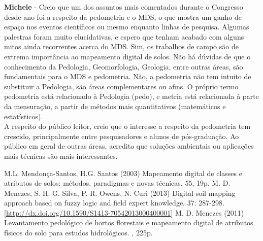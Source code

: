 \noindent \textbf{Michele} - Creio que um dos assuntos mais comentados durante o Congresso desde ano foi a respeito da pedometria e o MDS, o que mostra um ganho de espaço nos eventos científicos ou mesmo enquanto linhas de pesquisa. Algumas palestras foram muito elucidativas, e espero que tenham acabado com alguns mitos ainda recorrentes acerca do MDS. Sim, os trabalhos de campo são de extrema importância ao mapeamento digital de solos. Não há dúvidas de que o conhecimento da Pedologia, Geomorfologia, Geologia, entre outras áreas, são fundamentais para o MDS e pedometria. Não, a pedometria não tem intuito de substituir a Pedologia, são áreas complementares ou afins. O próprio termo pedometria está relacionado à Pedologia (pedo), e metria está relacionada à parte da mensuração, a partir de métodos mais quantitativos (matemáticos e estatísticos).\\
A respeito do público leitor, creio que o interesse a respeito da pedometria tem crescido, principalmente entre pesquisadores e alunos de pós-graduação. Ao público em geral de outras áreas, acredito que soluções ambientais ou aplicações mais técnicas são mais interessantes.
\begin{footnotesize}
\begin{thebibliography}{99}
M.L. Mendonça-Santos, H.G. Santos (2003)
\newblock Mapeamento digital de classes e atributos de solos: métodos, paradigmas e novas técnicas.
 55, 19p.
M. D. Menezes, S. H. G. Silva, P. R. Owens, N. Curi (2013)
\newblock Digital soil mapping approach based on fuzzy logic and field expert knowledge.
 37: 287-298. [\url{http://dx.doi.org/10.1590/S1413-70542013000400001}]
M. D. Menezes (2011)
\newblock Levantamento pedológico de hortos florestais e mapeamento digital de atributos físicos do solo para estudos hidrológicos.
, 225p.
\end{thebibliography} 
\end{footnotesize}
\address{Jean Michel Moura-Bueno\\
  Universidade Federal de Santa Maria\\
  }
